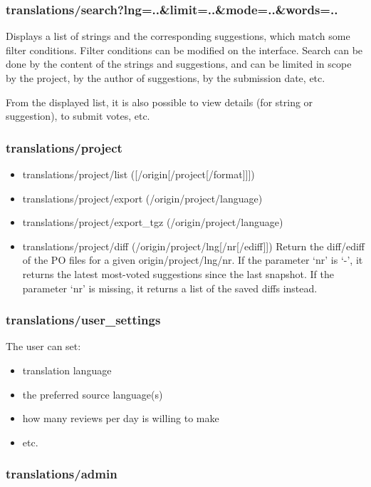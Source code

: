 \documentclass[11pt]{article}
\begin{document}
\subsubsection{translations/search?lng=..\&limit=..\&mode=..\&words=..}
\label{sec-8.3.2}


    Displays a list of strings and the corresponding suggestions, which
    match some filter conditions. Filter conditions can be modified on
    the interface. Search can be done by the content of the strings and
    suggestions, and can be limited in scope by the project, by the author
    of suggestions, by the submission date, etc.

    From the displayed list, it is also possible to view details (for
    string or suggestion), to submit votes, etc.


\subsubsection{translations/project}
\label{sec-8.3.3}

\begin{itemize}
\item translations/project/list ([/origin[/project[/format]]])
\item translations/project/export (/origin/project/language)
\item translations/project/export\_{}tgz (/origin/project/language)
\item translations/project/diff (/origin/project/lng[/nr[/ediff]])
      Return the diff/ediff of the PO files for a given
      origin/project/lng/nr.  If the parameter `nr' is `-', it returns
      the latest most-voted suggestions since the last snapshot.  If
      the parameter `nr' is missing, it returns a list of the saved
      diffs instead.
\end{itemize}
\subsubsection{translations/user\_{}settings}
\label{sec-8.3.4}

    The user can set:
\begin{itemize}
\item translation language
\item the preferred source language(s)
\item how many reviews per day is willing to make
\item etc.
\end{itemize}
\subsubsection{translations/admin}
\label{sec-8.3.5}
\end{document}
